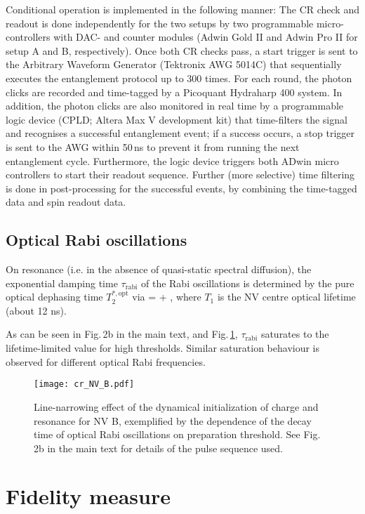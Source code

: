 Conditional operation is implemented in the following manner: The CR check and readout is done independently for the two setups by two programmable micro-controllers with DAC- and counter modules (Adwin Gold II and Adwin Pro II for setup A and B, respectively). Once both CR checks pass, a start trigger is sent to the Arbitrary Waveform Generator (Tektronix AWG 5014C) that sequentially executes the entanglement protocol up to 300 times. For each round, the photon clicks are recorded and time-tagged by a Picoquant Hydraharp 400 system. In addition, the photon clicks are also monitored in real time by a programmable logic device (CPLD; Altera Max V development kit) that time-filters the signal and recognises a successful entanglement event; if a success occurs, a stop trigger is sent to the AWG within 50\,ns to prevent it from running the next entanglement cycle. Furthermore, the logic device triggers both ADwin micro controllers to start their readout sequence. Further (more selective) time filtering is done in post-processing for the successful events, by combining the time-tagged data and spin readout data.

\subsection{Optical Rabi oscillations}
On resonance (i.e. in the absence of quasi-static spectral diffusion), the exponential damping time $\tau_{\text{rabi}}$ of the Rabi oscillations is determined by the pure optical dephasing time $T_2^{*,\text{opt}}$ via\cite{Robledo2010}
\be
{}= + ,
\ee
where $T_1$ is the NV centre optical lifetime (about 12 ns).

As can be seen in Fig.\,2b in the main text, and Fig.\,\ref{fig:cr_nv_B}, $\tau_{\text{rabi}}$ saturates to the lifetime-limited value for high thresholds. Similar saturation behaviour is observed for different optical Rabi frequencies.

\begin{figure}[h]
\centering
\texttt{[image: cr\_NV\_B.pdf]}
\caption{Line-narrowing effect of the dynamical initialization of charge and resonance for NV B, exemplified by the dependence of the decay time of optical Rabi oscillations on preparation threshold. See Fig.\,2b in the main text for details of the pulse sequence used.}
\label{fig:cr_nv_B}
\end{figure}


\section{Fidelity measure}

